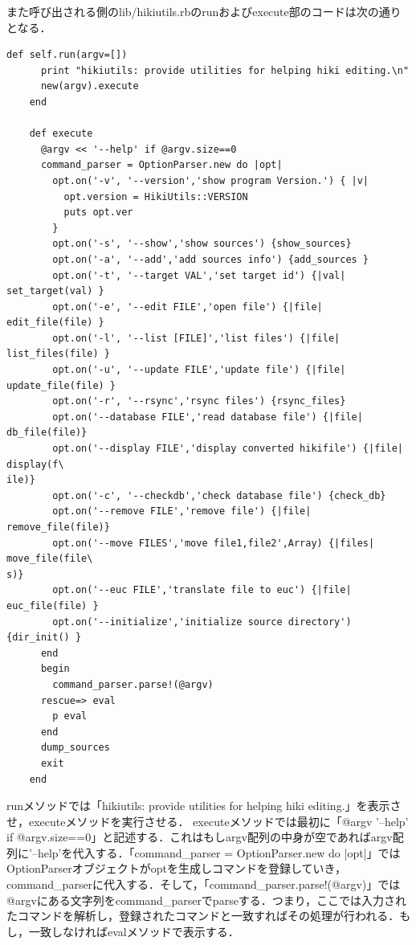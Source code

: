 また呼び出される側のlib/hikiutils.rbのrunおよびexecute部のコードは次の通りとなる．
\begin{lstlisting}[style=customRuby,basicstyle={\scriptsize\ttfamily}]
    def self.run(argv=[])
      print "hikiutils: provide utilities for helping hiki editing.\n"
      new(argv).execute
    end

    def execute
      @argv << '--help' if @argv.size==0
      command_parser = OptionParser.new do |opt|
        opt.on('-v', '--version','show program Version.') { |v|
          opt.version = HikiUtils::VERSION
          puts opt.ver
        }
        opt.on('-s', '--show','show sources') {show_sources}
        opt.on('-a', '--add','add sources info') {add_sources }
        opt.on('-t', '--target VAL','set target id') {|val| set_target(val) }
        opt.on('-e', '--edit FILE','open file') {|file| edit_file(file) }
        opt.on('-l', '--list [FILE]','list files') {|file| list_files(file) }
        opt.on('-u', '--update FILE','update file') {|file| update_file(file) }
        opt.on('-r', '--rsync','rsync files') {rsync_files}
        opt.on('--database FILE','read database file') {|file| db_file(file)}
        opt.on('--display FILE','display converted hikifile') {|file| display(f\
ile)}
        opt.on('-c', '--checkdb','check database file') {check_db}
        opt.on('--remove FILE','remove file') {|file| remove_file(file)}
        opt.on('--move FILES','move file1,file2',Array) {|files| move_file(file\
s)}
        opt.on('--euc FILE','translate file to euc') {|file| euc_file(file) }
        opt.on('--initialize','initialize source directory') {dir_init() }
      end
      begin
        command_parser.parse!(@argv)
      rescue=> eval
        p eval
      end
      dump_sources
      exit
    end  
\end{lstlisting}
runメソッドでは「hikiutils: provide utilities for helping hiki editing.」を表示させ，executeメソッドを実行させる．
executeメソッドでは最初に「@argv \<\< '--help' if @argv.size==0」と記述する．これはもしargv配列の中身が空であればargv配列に'--help'を代入する．「command\_parser = OptionParser.new do |opt|」ではOptionParserオブジェクトがoptを生成しコマンドを登録していき，command\_parserに代入する．そして，「command\_parser.parse!(@argv)」では@argvにある文字列をcommand\_parserでparseする．つまり，ここでは入力されたコマンドを解析し，登録されたコマンドと一致すればその処理が行われる．もし，一致しなければevalメソッドで表示する．

